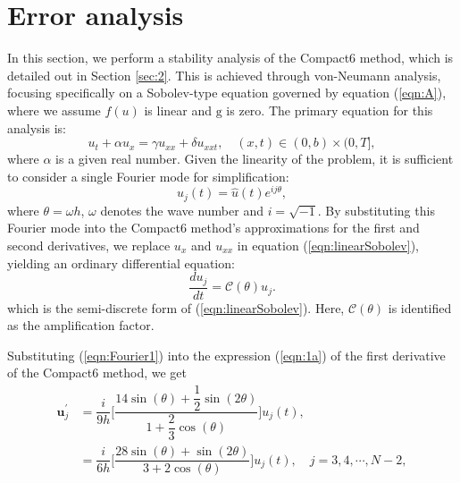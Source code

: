 \documentclass[11pt,a4paper]{amsart}
\theoremstyle{plain}
\theoremstyle{definition}
\theoremstyle{remark}
\numberwithin{equation}{section}
\begin{document}
\section{Error analysis}\label{sec:3}
In this section, we perform a stability analysis of the Compact6 method, which is detailed out in Section \ref{sec:2}. This is achieved through von-Neumann analysis, focusing specifically on a Sobolev-type equation governed by equation (\ref{eqn:A}), where we assume $f(u)$ is linear and $\mathrm{g}$ is zero. The primary equation for this analysis is:
\begin{equation}\label{eqn:linearSobolev}
    u_t+\alpha u_x = \gamma u_{xx} + \delta u_{xxt}, \quad (x,t) \in (0,b) \times (0, T],
\end{equation}
where $\alpha$ is a given real number. Given the linearity of the problem, it is sufficient to consider a single Fourier mode for simplification:
\begin{equation}\label{eqn:Fourier1}
    u_j(t) = \hat{u}(t) e^{ij\theta}, 
\end{equation}
where $\theta = \omega h$, $\omega$ denotes the wave number and $i = \sqrt{-1} $. By substituting this Fourier mode into the Compact6 method's approximations for the first and second derivatives, we replace $u_x$ and $u_{xx}$ in equation (\ref{eqn:linearSobolev}), yielding an ordinary differential equation:
\begin{equation}\label{eqn:AF}
    \dfrac{d u_j}{dt} = \mathcal{C}(\theta) u_j.
\end{equation}
which is the semi-discrete form of (\ref{eqn:linearSobolev}). Here, $\mathcal{C}(\theta)$ is identified as the amplification factor. 
\par Substituting (\ref{eqn:Fourier1}) into the expression (\ref{eqn:1a}) of the first derivative of the Compact6 method, we get
\begin{equation}\label{eqn:Compact6-1}
     \begin{aligned}
              \mathbf{u}^{\prime}_j &= \dfrac{i}{9h} \biggl[\dfrac{14 \sin(\theta) + \dfrac{1}{2} \sin(2\theta)}{1+\dfrac{2}{3} \cos(\theta)} \biggr] u_j(t),\\
               &= \dfrac{i}{6h} \biggl[\dfrac{28 \sin(\theta) + \sin(2\theta)}{3+2 \cos(\theta)} \biggr] u_j(t), \quad j = 3,4,\cdots, N-2, \\
        \end{aligned}
\end{equation}
\end{document}
